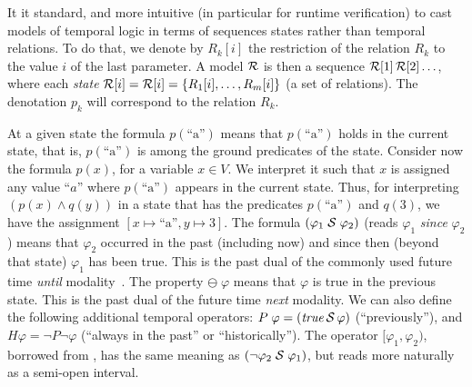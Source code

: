 It it standard, and more intuitive (in particular for runtime verification) to cast models of temporal logic in terms of sequences states rather than temporal relations. To do that,
 we denote by $R_k [ i ]$ the restriction of
 the relation $R_k$ to the value $i$ of the last parameter. A model ${\cal R}$ is then a sequence ${\cal R} [ 1 ]\, {\cal R} [ 2 ] \ldots$, where
 each {\em state} ${\cal R} [ i ] = {\cal R} [i] = \{ R_1 [i], \ldots , R_m [ i ] \}$  (a set of relations).
 The denotation $p_k$ will correspond to the relation $R_k$.


\iffalse
At a given state the formula
$p(\text{``a''})$ means that $p (\text{``a''} )$ holds
in the current state,
that is, $p (\text{``a''} )$ is among 
the ground predicates of the state.
Consider now the formula $p ( x )$, for a variable $x \in V$.
We interpret it such that $x$ is assigned any value ``$a$'' where
$p ( \text{``a''} )$ appears in the current state. 
Thus, for interpreting $(p ( x ) \wedge q ( y ))$ in a state that
has the predicates
$p ( \text{``a''} )$ and $q ( 3 )$,
we have the assignment $[ x \mapsto \text{``a''} , y \mapsto 3 ]$.
The formula $(\varphi_1\; {\cal S}\; \varphi_2)$ 
(reads $\varphi_1$ {\em since} $\varphi_2$)
means that $\varphi_2$ occurred in the past (including now)
and since then (beyond that state) $\varphi_1$ has been true. This is the 
past dual of the commonly used %
future time  {\em until} modality~\cite{MP}. 
The property $\ominus \; \varphi$ means that $\varphi$ is true 
in the previous state.
This is the past dual of the %
future time {\em next} modality.
We can also define the following additional temporal operators:
$P \; \varphi = (\mathit{true} \, {\cal S} \, \varphi)$ (``previously''),
and $H \varphi = \neg P \neg \varphi$ (``always in the past'' or ``historically'').
The operator $[\varphi_1,\varphi_2)$, borrowed from \cite{MaC}, 
has the same meaning as $(\neg \varphi_2\; {\cal S}\; \varphi_1)$, but reads more naturally as
a semi-open interval. 




